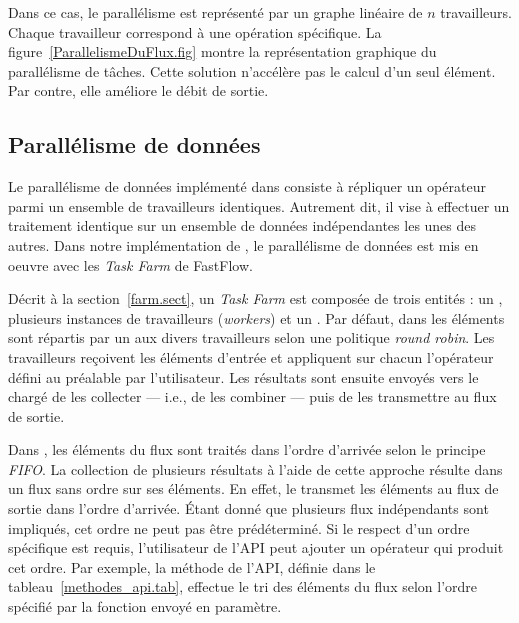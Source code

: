 Dans ce cas, le parall\'elisme est repr\'esent\'e par un graphe lin\'eaire de $n$ travailleurs. Chaque travailleur correspond \`a une op\'eration sp\'ecifique. La figure~\ref{ParallelismeDuFlux.fig} montre la repr\'esentation graphique du parall\'elisme de t\^aches. Cette solution n'acc\'el\`ere pas le calcul d'un seul \'el\'ement. Par contre, elle am\'eliore le d\'ebit de sortie.

\subsection{Parall\'elisme de donn\'ees}

Le parall\'elisme de donn\'ees impl\'ement\'e dans   consiste \`a r\'epliquer un op\'erateur parmi un ensemble de travailleurs identiques. Autrement dit, il vise \`a effectuer un traitement identique sur un ensemble de donn\'ees ind\'ependantes les unes des autres. 
%
Dans notre impl\'ementation de \PpFf, le parall\'elisme de donn\'ees est mis en oeuvre avec les \emph{Task Farm} de FastFlow.


D\'ecrit \`a la section~\ref{farm.sect}, un \emph{Task Farm} est compos\'ee de trois entit\'es : un , plusieurs instances de travailleurs (\emph{workers}) et un . Par d\'efaut, dans \PpFf{} les \'el\'ements sont r\'epartis par un  aux divers travailleurs selon une politique \emph{round robin}. Les travailleurs re\c{c}oivent les \'el\'ements d'entr\'ee et appliquent sur chacun l'op\'erateur d\'efini au pr\'ealable par l'utilisateur. Les r\'esultats sont ensuite envoy\'es vers le  charg\'e de les collecter --- i.e., de les combiner --- puis de les transmettre au flux de sortie.

Dans , les \'el\'ements du flux sont trait\'es dans l'ordre d'arriv\'ee selon le principe \emph{FIFO}. La collection de plusieurs r\'esultats \`a l'aide de cette approche r\'esulte dans un flux sans ordre sur ses \'el\'ements. En effet, le  transmet les \'el\'ements au flux de sortie dans l'ordre d'arriv\'ee. \'Etant donn\'e que plusieurs flux ind\'ependants sont impliqu\'es, cet ordre ne peut pas \^etre pr\'ed\'etermin\'e. Si le respect d'un  ordre sp\'ecifique est requis, l'utilisateur de l'API peut ajouter un op\'erateur qui produit cet ordre. Par exemple, la m\'ethode  de l'API, d\'efinie dans le tableau~\ref{methodes_api.tab}, effectue le tri des \'el\'ements du flux selon l'ordre sp\'ecifi\'e par la fonction  envoy\'e en param\`etre.

